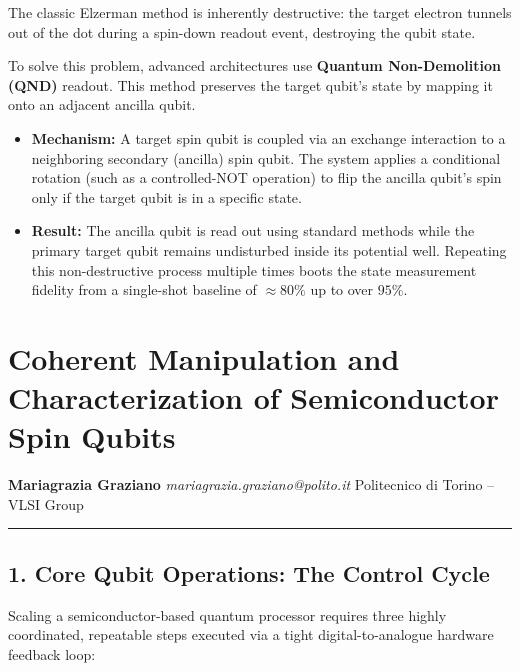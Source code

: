 \documentclass[
]{article}
\providecommand{\tightlist}{%
  \setlength{\itemsep}{0pt}\setlength{\parskip}{0pt}}
\begin{document}
The classic Elzerman method is inherently destructive: the target
electron tunnels out of the dot during a spin-down readout event,
destroying the qubit state.

To solve this problem, advanced architectures use \textbf{Quantum
Non-Demolition (QND)} readout. This method preserves the target qubit's
state by mapping it onto an adjacent ancilla qubit.

\begin{itemize}
\tightlist
\item
  \textbf{Mechanism:} A target spin qubit is coupled via an exchange
  interaction to a neighboring secondary (ancilla) spin qubit. The
  system applies a conditional rotation (such as a controlled-NOT
  operation) to flip the ancilla qubit's spin only if the target qubit
  is in a specific state.
\item
  \textbf{Result:} The ancilla qubit is read out using standard methods
  while the primary target qubit remains undisturbed inside its
  potential well. Repeating this non-destructive process multiple times
  boots the state measurement fidelity from a single-shot baseline of
  \(\approx 80\%\) up to over \textbf{\(95\%\)}.
\end{itemize}

\section{Coherent Manipulation and Characterization of Semiconductor
Spin
Qubits}\label{coherent-manipulation-and-characterization-of-semiconductor-spin-qubits}

\textbf{Mariagrazia Graziano} \emph{mariagrazia.graziano@polito.it}
Politecnico di Torino -- VLSI Group

\begin{center}\rule{0.5\linewidth}{0.5pt}\end{center}

\subsection{1. Core Qubit Operations: The Control
Cycle}\label{core-qubit-operations-the-control-cycle}

Scaling a semiconductor-based quantum processor requires three highly
coordinated, repeatable steps executed via a tight digital-to-analogue
hardware feedback loop:
\end{document}
